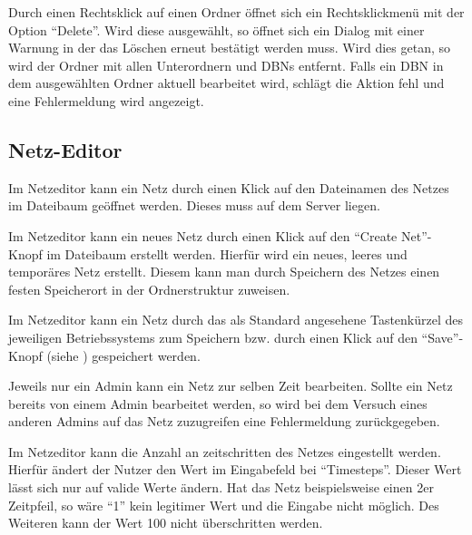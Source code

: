 \documentclass[parskip=full,11pt,twoside]{scrartcl}
\begin{document}

Durch einen Rechtsklick auf einen Ordner öffnet sich ein Rechtsklickmenü mit der Option \enquote{Delete}. Wird diese ausgewählt, so öffnet sich ein Dialog mit einer Warnung in der das Löschen erneut bestätigt werden muss. Wird dies getan, so wird der Ordner mit allen Unterordnern und DBNs entfernt.
Falls ein DBN in dem ausgewählten Ordner aktuell bearbeitet wird, schlägt die Aktion fehl und eine Fehlermeldung wird angezeigt.


\subsection{Netz-Editor}

Im Netzeditor kann ein Netz durch einen Klick auf den Dateinamen des Netzes im Dateibaum geöffnet werden. Dieses muss auf dem Server liegen.

Im Netzeditor kann ein neues Netz durch einen Klick auf den \enquote{Create Net}-Knopf im Dateibaum erstellt werden. Hierfür wird ein neues, leeres und temporäres Netz erstellt. Diesem kann man durch Speichern des Netzes einen festen Speicherort in der Ordnerstruktur zuweisen.

Im Netzeditor kann ein Netz durch das als Standard angesehene Tastenkürzel des jeweiligen Betriebssystems zum Speichern bzw. durch einen Klick auf den \enquote{Save}-Knopf (siehe ) gespeichert werden.

Jeweils nur ein Admin kann ein Netz zur selben Zeit bearbeiten. Sollte ein Netz bereits von einem Admin bearbeitet werden, so wird bei dem Versuch eines anderen Admins auf das Netz zuzugreifen eine Fehlermeldung zurückgegeben.

Im Netzeditor kann die Anzahl an \gls{zeitschritte}n des Netzes eingestellt werden. Hierfür ändert der Nutzer den Wert im Eingabefeld bei \enquote{Timesteps}. Dieser Wert lässt sich nur auf valide Werte ändern. Hat das Netz beispielsweise einen 2er Zeitpfeil, so wäre \enquote{1} kein legitimer Wert und die Eingabe nicht möglich. Des Weiteren kann der Wert 100 nicht überschritten werden. 
\end{document}
